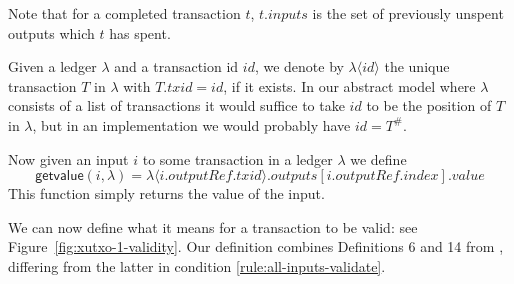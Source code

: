 \documentclass[a4paper]{article}
\theoremstyle{definition}  %
\newcommand{\mi}[1]{\ensuremath{\mathit{#1}}}
\newcommand{\txid}{\mi{txid}}
\newcommand{\idx}{\mi{index}}
\newcommand{\inputs}{\mi{inputs}}
\newcommand{\outputs}{\mi{outputs}}
\newcommand{\val}{\mi{value}}  %
\newcommand{\outputref}{\mi{outputRef}}
\newcommand{\id}{\mi{id}}
\newcommand{\getvalue}{\msf{getvalue}}
\newcommand{\msf}[1]{\ensuremath{\mathsf{#1}}}
\begin{document}
\noindent Note that for a completed transaction $t$, $t.\inputs$ is
the set of previously unspent outputs which $t$ has spent.

\medskip
\noindent Given a ledger $\lambda$ and a transaction id $\id$, we
denote by $\lambda\langle\id\rangle$ the unique transaction $T$ in
$\lambda$ with $T.\txid = \id$, if it exists. In our abstract model
where $\lambda$ consists of a list of transactions it would suffice to
take $id$ to be the position of $T$ in $\lambda$, but in an
implementation we would probably have $id = T^{\#}$.

\medskip
\noindent Now given an input $i$ to some transaction in a ledger
$\lambda$ we define
$$
\getvalue(i,\lambda) = \lambda\langle i.\outputref.\txid \rangle.\outputs[i.\outputref.\idx].\val
$$
This function simply returns the value of the input.

\bigskip

\noindent We can now define what it means for a transaction to be valid: see
Figure~\ref{fig:xutxo-1-validity}.  Our definition combines
Definitions 6 and 14 from \cite{Zahnentferner18-UTxO}, differing from
the latter in condition \ref{rule:all-inputs-validate}.
\end{document}
